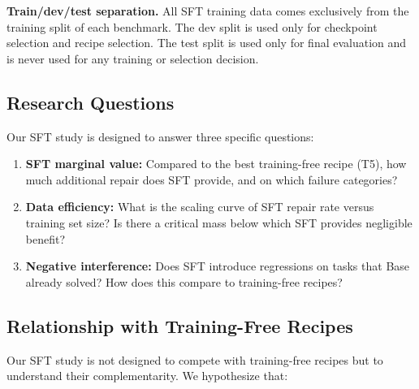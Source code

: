 \textbf{Train/dev/test separation.} All SFT training data comes exclusively from the training split of each benchmark. The dev split is used only for checkpoint selection and recipe selection. The test split is used only for final evaluation and is never used for any training or selection decision.


\subsection{Research Questions}
\label{sec:sft:rqs}

Our SFT study is designed to answer three specific questions:

\begin{enumerate}[leftmargin=2em, label=(\alph*), itemsep=1pt]
  \item \textbf{SFT marginal value:} Compared to the best training-free recipe (T5), how much additional repair does SFT provide, and on which failure categories?
  \item \textbf{Data efficiency:} What is the scaling curve of SFT repair rate versus training set size? Is there a critical mass below which SFT provides negligible benefit?
  \item \textbf{Negative interference:} Does SFT introduce regressions on tasks that Base already solved? How does this compare to training-free recipes?
\end{enumerate}


\subsection{Relationship with Training-Free Recipes}
\label{sec:sft:relationship}

Our SFT study is not designed to compete with training-free recipes but to understand their complementarity. We hypothesize that:

